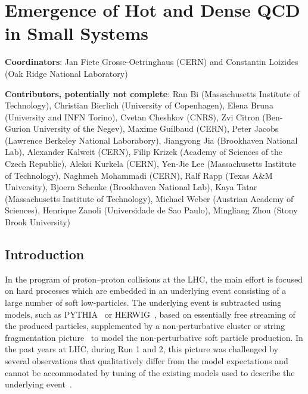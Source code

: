 \documentclass[../report.tex]{subfiles}
\begin{document}
\section{Emergence of Hot and Dense QCD in Small Systems}
\label{chapter:smallsystems}

\noindent \textbf{Coordinators}: Jan Fiete Grosse-Oetringhaus (CERN) and Constantin Loizides (Oak Ridge National Laboratory)

\noindent \textbf{Contributors, potentially not complete}:
Ran Bi (Massachusetts Institute of Technology),
Christian Bierlich (University of Copenhagen),
Elena Bruna (University and INFN Torino),
Cvetan Cheshkov (CNRS),
Zvi Citron (Ben-Gurion University of the Negev),
Maxime Guilbaud (CERN),
Peter Jacobs (Lawrence Berkeley National Laborabory),
Jiangyong Jia (Brookhaven National Lab),
Alexander Kalweit (CERN),
Filip Krizek (Academy of Sciences of the Czech Republic),
Aleksi Kurkela (CERN),
Yen-Jie Lee (Massachusetts Institute of Technology),
Naghmeh Mohammadi (CERN),
Ralf Rapp (Texas A\&M University),
Bjoern Schenke (Brookhaven National Lab),
Kaya Tatar (Massachusetts Institute of Technology),
Michael Weber (Austrian Academy of Sciences),
Henrique Zanoli (Universidade de Sao Paulo),
Mingliang Zhou (Stony Brook University)

\subsection{Introduction}

In the program of proton--proton collisions at the LHC, the main effort is focused on hard processes which are embedded in an underlying event consisting of a large number of soft low-\pT particles. The underlying event is subtracted using models, such as PYTHIA~\cite{Sjostrand:2014zea} or HERWIG~\cite{Bellm:2015jjp}, based on essentially free streaming of the produced particles, supplemented by a non-perturbative cluster or string fragmentation picture~\cite{Andersson:1983ia,Webber:1983if} to model the non-perturbative soft particle production.
In the past years at LHC, during Run 1 and 2, this picture was challenged by several observations that qualitatively differ from the model expectations and cannot be accommodated by tuning of the existing models used to describe the underlying event~\cite{Fischer:2016zzs}.
\end{document}
